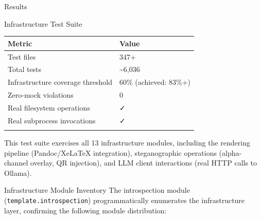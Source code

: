 \documentclass[
  ignorenonframetext,
]{beamer}
\newcounter{none} %
\begin{document}
\begin{frame}[fragile]{Results}
\begin{block}{Infrastructure Test Suite}
{\def\LTcaptype{none} %
\begin{longtable}[]{@{}ll@{}}
\toprule\noalign{}
Metric & Value \\
\midrule\noalign{}
\endhead
Test files & 347+ \\
Total tests & \textasciitilde6,036 \\
Infrastructure coverage threshold & 60\% (achieved: 83\%+) \\
Zero-mock violations & 0 \\
Real filesystem operations & ✓ \\
Real subprocess invocations & ✓ \\
\bottomrule\noalign{}
\end{longtable}
}

This test suite exercises all 13 infrastructure modules, including the
rendering pipeline (Pandoc/XeLaTeX integration), steganographic
operations (alpha-channel overlay, QR injection), and LLM client
interactions (real HTTP calls to Ollama).
\end{block}

\begin{block}{Infrastructure Module Inventory}
\protect{}\label{infrastructure-module-inventory}
The introspection module (\texttt{template.introspection})
programmatically enumerates the infrastructure layer, confirming the
following module distribution:


\end{block}
\end{frame}
\end{document}

